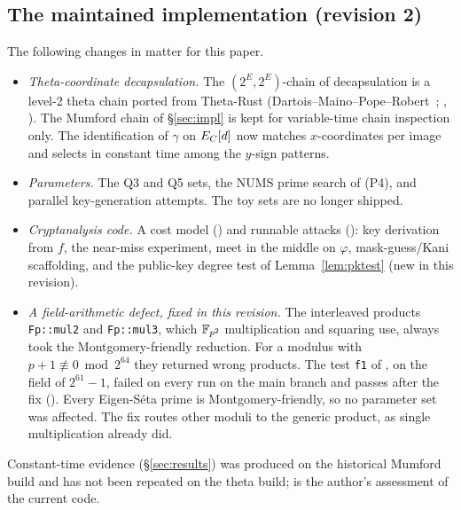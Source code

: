 \subsection{The maintained implementation (revision 2)}\label{sec:impl-v2}
The following changes in  matter for this paper.
\begin{itemize}
\item \emph{Theta-coordinate decapsulation.} The $(2^E,2^E)$-chain of
  decapsulation is a level-2 theta chain ported from Theta-Rust
  (Dartois--Maino--Pope--Robert~\cite{DMPR23};
  , ). The Mumford chain of
  \S\ref{sec:impl} is kept for variable-time chain inspection only. The
  identification of $\gamma$ on $E_C[d]$ now matches $x$-coordinates per image
  and selects in constant time among the $y$-sign patterns.
\item \emph{Parameters.} The Q3 and Q5 sets, the NUMS prime search of (P4),
  and parallel key-generation attempts. The toy sets are no longer shipped.
\item \emph{Cryptanalysis code.} A cost model ()
  and runnable attacks (): key derivation from
  $f$, the near-miss experiment, meet in the middle on $\varphi$,
  mask-guess/Kani scaffolding, and the public-key degree test of
  Lemma~\ref{lem:pktest} (new in this revision).
\item \emph{A field-arithmetic defect, fixed in this revision.} The
  interleaved products \texttt{Fp::mul2} and \texttt{Fp::mul3}, which
  $\mathbb{F}_{p^2}$ multiplication and squaring use, always took the
  Montgomery-friendly reduction. For a modulus with $p+1\not\equiv0\bmod2^{64}$
  they returned wrong products. The test \texttt{f1} of
  , on the field of $2^{61}-1$, failed on every run
  on the main branch and passes after the fix
  (). Every Eigen-S\'eta prime
  is Montgomery-friendly, so no parameter set was affected. The fix routes
  other moduli to the generic product, as single multiplication already did.
\end{itemize}
Constant-time evidence (\S\ref{sec:results}) was produced on the historical
Mumford build and has not been repeated on the theta build;
 is the author's assessment of the current code.

